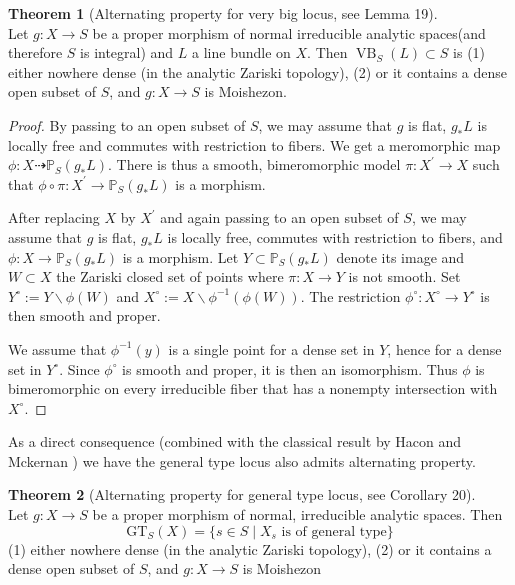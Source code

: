 \documentclass[11pt]{article}
\theoremstyle{definition}
\newtheorem{theorem}{Theorem}[section]
\begin{document}
	\begin{theorem}[Alternating property for very big locus, see \cite{Moishezonmorphism} Lemma 19]\label{verybig}~\\
		 Let $g: X \rightarrow S$ be a proper morphism of normal irreducible analytic spaces(and therefore $S$ is integral)  and $L$ a line bundle on $X$. Then $\operatorname{VB}_S(L) \subset S$ is
		(1) either nowhere dense (in the analytic Zariski topology),
		(2) or it contains a dense open subset of $S$, and $g: X \rightarrow S$ is Moishezon.
	\end{theorem}
	\begin{proof}
	By passing to an open subset of $S$, we may assume that $g$ is flat, $g_* L$ is locally free and commutes with restriction to fibers. We get a meromorphic map $\phi: X \dashrightarrow \mathbb{P}_S\left(g_* L\right)$. There is thus a smooth, bimeromorphic model $\pi: X^{\prime} \rightarrow X$ such that $\phi \circ \pi: X^{\prime} \rightarrow \mathbb{P}_S\left(g_* L\right)$ is a morphism.
	
	After replacing $X$ by $X^{\prime}$ and again passing to an open subset of $S$, we may assume that $g$ is flat, $g_* L$ is locally free, commutes with restriction to fibers, and $\phi: X \rightarrow \mathbb{P}_S\left(g_* L\right)$ is a morphism. Let $Y \subset \mathbb{P}_S\left(g_* L\right)$ denote its image and $W \subset X$ the Zariski closed set of points where $\pi: X \rightarrow Y$ is not smooth. Set $Y^{\circ}:=Y \backslash \phi(W)$ and $X^{\circ}:=X \backslash \phi^{-1}(\phi(W))$. The restriction $\phi^{\circ}: X^{\circ} \rightarrow Y^{\circ}$ is then smooth and proper.
	
	We assume that $\phi^{-1}(y)$ is a single point for a dense set in $Y$, hence for a dense set in $Y^{\circ}$. Since $\phi^{\circ}$ is smooth and proper, it is then an isomorphism. Thus $\phi$ is bimeromorphic on every irreducible fiber that has a nonempty intersection with $X^{\circ}$.
	\end{proof}
	As a direct consequence (combined with the classical result by Hacon and Mckernan \cite{HaconMckernan}) we have the general type locus also admits alternating property.
	
	\begin{theorem}[Alternating property for general type locus, see \cite{Moishezonmorphism} Corollary 20]~\\
		Let $g: X \rightarrow S$ be a proper morphism of normal, irreducible analytic spaces. Then $$\text{GT}_S(X) = \{s\in S \mid X_s \text{ is of general type}\}$$(1) either nowhere dense (in the analytic Zariski topology),
		(2) or it contains a dense open subset of $S$, and $g: X \rightarrow S$ is Moishezon
	\end{theorem}
	
\end{document}
